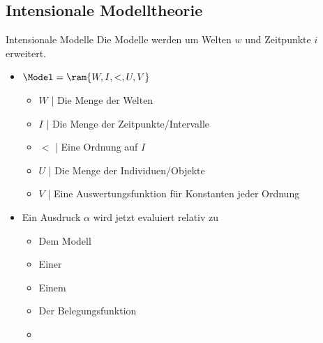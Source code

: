 \subsection{Intensionale Modelltheorie}

\begin{frame}
  {Intensionale Modelle}
  \onslide<+->
  \onslide<+->
  Die Modelle werden um Welten $w$ und Zeitpunkte $i$ erweitert.\\
  \Halbzeile
  \begin{itemize}[<+->]
    \item \alert{$\Model=\ram{W,I,<,U,V}$}
      \begin{itemize}[<+->]
        \item \alert{$W$} | Die Menge der Welten
        \item \alert{$I$} | Die Menge der Zeitpunkte\slash Intervalle
        \item \alert{$<$} | Eine Ordnung auf $I$
        \item \alert{$U$} | Die Menge der Individuen\slash Objekte
        \item \alert{$V$} | Eine Auswertungsfunktion für Konstanten jeder Ordnung
      \end{itemize}
      \Halbzeile
    \item Ein Ausdruck $\alpha$ wird jetzt evaluiert relativ zu
      \begin{itemize}[<+->]
        \item Dem Modell \gruen{$\Model$}
        \item Einer  
        \item Einem  
        \item Der Belegungsfunktion 
          \Halbzeile
        \item \gruen{$\DEMM{\alpha}$}
      \end{itemize}
  \end{itemize}
\end{frame}


